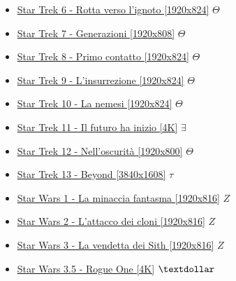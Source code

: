 \begin{itemize}
			\item \href{https://mega.nz/#!mwQi2ZYR!sEAG7JSeCmeU2oHzkmO3FuJhy3INxIukDvp9-jSL9og} {Star Trek 6 - Rotta verso l'ignoto [1920x824]}  $\Theta$ \\
			\item \href{https://mega.nz/#!ToRyjZJa!A5eFp_0ywB70VFJwPT6hT5-uYZYr2BfBLmIKWv4Tx_U} {Star Trek 7 - Generazioni [1920x808]}  $\Theta$ \\
			\item \href{https://mega.nz/#!zhY3nZ7I!26L0Au-Ak8VwFpLyKJfGw8lDcE8guhdBP7XdGXuMPkw} {Star Trek 8 - Primo contatto  [1920x824]}  $\Theta$ \\
			\item \href{https://mega.nz/#!OhQzyZbJ!Hx0ZzMeDZPmite31xI9SgNapE7_K3zU-6TNasOpwa5c} {Star Trek 9 - L'insurrezione [1920x824]}  $\Theta$ \\
			\item \href{https://mega.nz/#!ulg2HDYb!qvgP0hGB7dIfBhF_Egflkcf2x-m6DnQr_m5F2BIpBR8} {Star Trek 10 - La nemesi  [1920x824]}  $\Theta$ \\
			\item \href{https://mega.nz/#!q2BlSTgT!YkL2z1u7qKEMoyBPb4PGi8EgoGtJ-aG9RWPqw77J61M} {Star Trek 11 - Il futuro ha inizio [4K]}  $\exists$ \\
			\item \href{https://mega.nz/#!qk40USxa!Gx_SptN9CtA1wWETef49Ll5DVc7i-kosMbQzb2t9Z5U} {Star Trek 12 - Nell'oscurità [1920x800]}  $\Theta$ \\
			\item \href{https://mega.nz/#!sppGybYK!jH3zR2Fb7jbr3fJJm-sUn55eJaDrGxNgjUMx-0DTsJE} {Star Trek 13 - Beyond [3840x1608]}  $\tau$ \\
			\item \href{https://mega.nz/#!FBBDGJpD!rXYHiV_xkgtIHWW2VIGtgZLRlEjQWo7qD-yUW8smiBY} {Star Wars 1 - La minaccia fantasma [1920x816]}  $Z$ \\
			\item \href{https://mega.nz/#!BVhmyRRb!HezpW-46uC61_Dk0BYi0hW9Qr1IMZNOgTV0udktNyLY} {Star Wars 2 - L'attacco dei cloni [1920x816]}  $Z$ \\
			\item \href{https://mega.nz/#!JE5V0TQa!QAOtvfXUu8jnNz7VPoJPAIRLA0QF9Ga0I_43BB9wh8k} {Star Wars 3 - La vendetta dei Sith [1920x816]}  $Z$ \\
			\item \href{https://mega.nz/#!TrYx0LiB!zrtdbxJbq88JqUHh9xvRAoK_8FjLHZXcMiCXqTKthxU} {Star Wars 3.5 - Rogue One [4K]}  $\textdollar$ \\

\end{itemize}
